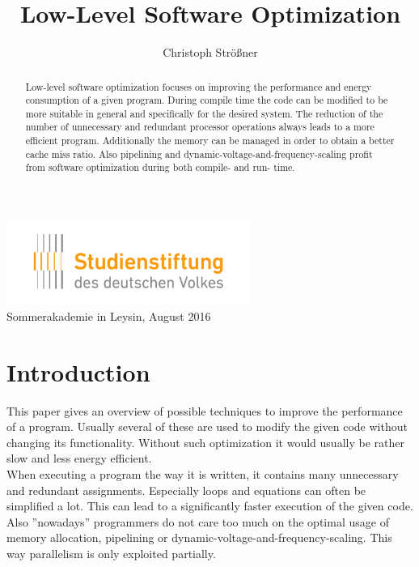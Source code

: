 \documentclass[12pt, a4paper]{article}
\begin{document}
\title{%
  {\bfseries Low-Level Software Optimization}\\[1ex] %
  {\large\bfseries } %
}
\author{Christoph Strößner} %

\date{\vspace{-5ex}} %

{\sf \maketitle} %

\begin{center}
  \includegraphics[width=8cm]{logo_sdv.pdf}\\
  {\large\sf Sommerakademie in Leysin, August 2016}
\end{center}

\vspace{1cm}

\begin{abstract}
Low-level software optimization focuses on improving the performance and energy consumption of a given program. During compile time the code can be modified to be more suitable in general and specifically for the desired system. The reduction of the number of unnecessary and redundant processor operations always leads to a more efficient program. Additionally the memory can be managed in order to obtain a better cache miss ratio. Also pipelining and dynamic-voltage-and-frequency-scaling profit from software optimization during both compile- and run- time.
\end{abstract}

\newpage
\tableofcontents

\newpage
\section{Introduction}
This paper gives an overview of possible techniques to improve the performance of a program. Usually several of these are used to modify the given code without changing its functionality. Without such optimization it would usually be rather  slow and less energy efficient. \\
When executing a program the way it is written, it contains many unnecessary and redundant assignments. Especially loops and equations can often be simplified a lot. This can lead to a significantly faster execution of the given code. Also ''nowadays'' programmers do not care too much  on the optimal usage of memory allocation, pipelining or dynamic-voltage-and-frequency-scaling. This way parallelism is only exploited partially.
\end{document}
